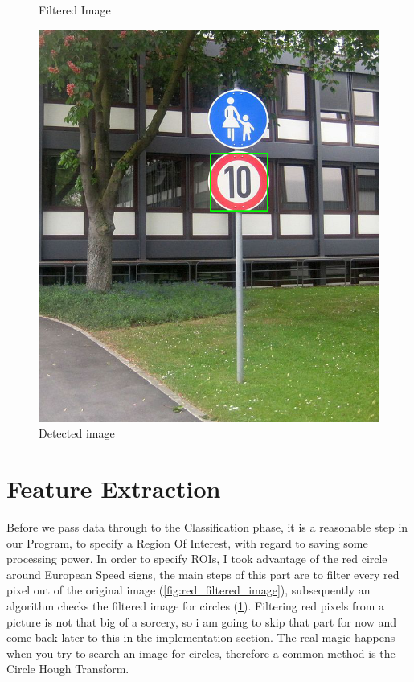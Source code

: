 \begin{figure}[H]
	\caption{Filtered Image}\label{fig:red_filtered_image}
	\endminipage\hfill
	\includegraphics[width=\linewidth]{images/detectedimg.png}
	\caption{Detected image}\label{fig:detected_image}
	\endminipage
\end{figure}

\section{Feature Extraction}
Before we pass data through to the Classification phase, it is a reasonable step in our Program, to specify a Region Of Interest, with regard to saving some processing power. In order to specify ROIs, I took advantage of the red circle around European Speed signs, the main steps of this part are to filter every red pixel out of the original image (\ref{fig:red_filtered_image}), subsequently an algorithm checks the filtered image for circles (\ref{fig:detected_image}). Filtering red pixels from a picture is not that big of a sorcery, so i am going to skip that part for now and come back later to this in the implementation section. The real magic happens when you try to search an image for circles, therefore a common method is the Circle Hough Transform. 

